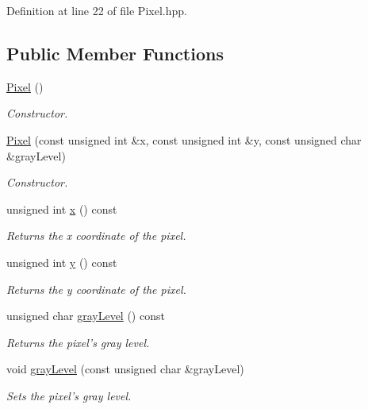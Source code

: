 Definition at line 22 of file Pixel.hpp.\subsection*{Public Member Functions}
\begin{CompactItemize}
\item 
\hyperlink{class_pixel_27ad99a2f705e635c42d242d530d4756}{Pixel} ()
\begin{CompactList}\small\item\em Constructor. \item\end{CompactList}\item 
\hyperlink{class_pixel_31103b6b7b52712789d1fdab7ab7ce29}{Pixel} (const unsigned int \&x, const unsigned int \&y, const unsigned char \&grayLevel)
\begin{CompactList}\small\item\em Constructor. \item\end{CompactList}\item 
unsigned int \hyperlink{class_pixel_68dafccc4588fb33d445641c2766316b}{x} () const 
\begin{CompactList}\small\item\em Returns the x coordinate of the pixel. \item\end{CompactList}\item 
unsigned int \hyperlink{class_pixel_204cc91a99e1e4f1d96c9cf6caf5747a}{y} () const 
\begin{CompactList}\small\item\em Returns the y coordinate of the pixel. \item\end{CompactList}\item 
unsigned char \hyperlink{class_pixel_d82be37dbb53c7ba48c5464b3a3382c6}{grayLevel} () const 
\begin{CompactList}\small\item\em Returns the pixel's gray level. \item\end{CompactList}\item 
void \hyperlink{class_pixel_d00a337e0d9765daafe3017f2d819df8}{grayLevel} (const unsigned char \&grayLevel)
\begin{CompactList}\small\item\em Sets the pixel's gray level. \item\end{CompactList}\end{CompactItemize}
